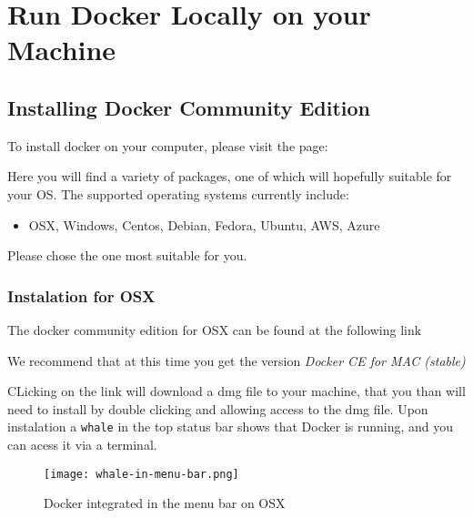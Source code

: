 \chapter{Run Docker Locally on your Machine}\label{S:docker-local}

\section{Installing Docker Community Edition}\label{installing-docker-community-edition}

To install docker on your computer, please visit the page:


Here you will find a variety of packages, one of which will hopefully
suitable for your OS. The supported operating systems currently include:

\begin{itemize}
\item  OSX, Windows, Centos, Debian, Fedora, Ubuntu, AWS, Azure
\end{itemize}

Please chose the one most suitable for you.

\subsection{Instalation for OSX}\label{instalation-for-osx}

The docker community edition for OSX can be found at the following link


We recommend that at this time you get the version {\em Docker CE for MAC (stable)}


CLicking on the link will download a dmg file to your machine, that
you than will need to install by double clicking and allowing access
to the dmg file. Upon instalation a \texttt{whale} in the top status
bar shows that Docker is running, and you can acess it via a terminal.

\begin{figure}[htb]
\centering
\texttt{[image: whale-in-menu-bar.png]}
\caption{Docker integrated in the menu bar on OSX}
\end{figure}

